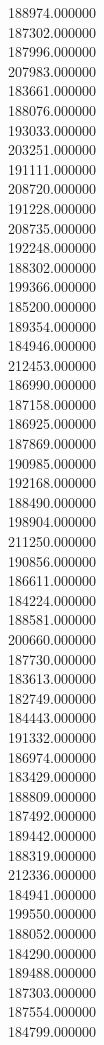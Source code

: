 188974.000000\\
187302.000000\\
187996.000000\\
207983.000000\\
183661.000000\\
188076.000000\\
193033.000000\\
203251.000000\\
191111.000000\\
208720.000000\\
191228.000000\\
208735.000000\\
192248.000000\\
188302.000000\\
199366.000000\\
185200.000000\\
189354.000000\\
184946.000000\\
212453.000000\\
186990.000000\\
187158.000000\\
186925.000000\\
187869.000000\\
190985.000000\\
192168.000000\\
188490.000000\\
198904.000000\\
211250.000000\\
190856.000000\\
186611.000000\\
184224.000000\\
188581.000000\\
200660.000000\\
187730.000000\\
183613.000000\\
182749.000000\\
184443.000000\\
191332.000000\\
186974.000000\\
183429.000000\\
188809.000000\\
187492.000000\\
189442.000000\\
188319.000000\\
212336.000000\\
184941.000000\\
199550.000000\\
188052.000000\\
184290.000000\\
189488.000000\\
187303.000000\\
187554.000000\\
184799.000000\\

